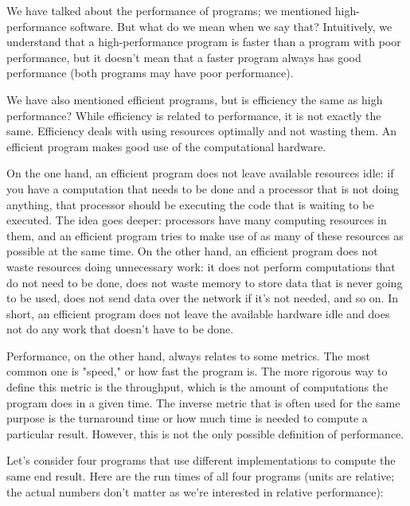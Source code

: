 We have talked about the performance of programs; we mentioned high-performance software. But what do we mean when we say that? Intuitively, we understand that a high-performance program is faster than a program with poor performance, but it doesn't mean that a faster program always has good performance (both programs may have poor performance). 

We have also mentioned efficient programs, but is efficiency the same as high performance? While efficiency is related to performance, it is not exactly the same. Efficiency deals with using resources optimally and not wasting them. An efficient program makes good use of the computational hardware.

On the one hand, an efficient program does not leave available resources idle: if you have a computation that needs to be done and a processor that is  not doing anything, that processor should be executing the code that is waiting to be executed. The idea goes deeper: processors have many computing resources in them, and an efficient program tries to make use of as many of these resources as possible at the same time. On the other hand, an efficient program does not waste resources doing unnecessary work: it does not perform computations that do not need to be done, does not waste memory to store data that is never going to be used, does not send data over the network if it's not needed, and so on. In short, an efficient program does not leave the available hardware idle and does not do any work that doesn't have to be done.

Performance, on the other hand, always relates to some metrics. The most common one is "speed," or how fast the program is. The more rigorous way to define this metric is the throughput, which is the amount of computations the program does in a given time. The inverse metric that is often used for the same purpose is the turnaround time or how much time is needed to compute a particular result. However, this is not the only possible definition of performance.


Let's consider four programs that use different implementations to compute the same end result. Here are the run times of all four programs (units are relative; the actual numbers don't matter as we're interested in relative performance):

